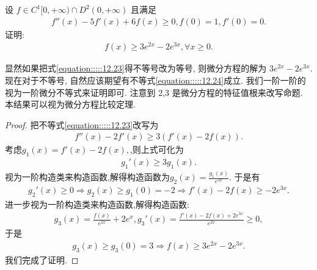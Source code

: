 \documentclass[../../main.tex]{subfiles}
\begin{document}
\begin{example}
设 $f\in C^1[0,+\infty)\cap D^2(0,+\infty)$ 且满足
\begin{align}
f''(x)-5f'(x)+6f(x)\geqslant0,f(0)=1,f'(0)=0.
\label{equation:::::12.23}
\end{align}
证明:
\begin{align}
f(x)\geqslant3e^{2x}-2e^{3x},\forall x\geqslant0.
\label{equation:::::12.24}
\end{align}
\end{example}
\begin{note}
显然如果把式\eqref{equation:::::12.23}得不等号改为等号, 则微分方程的解为 $3e^{2x}-2e^{3x}$. 现在对于不等号, 自然应该期望有不等式\eqref{equation:::::12.24}成立. 我们一阶一阶的视为一阶微分不等式来证明即可. 注意到 2,3 是微分方程的特征值根来改写命题. 本结果可以视为微分方程比较定理.
\end{note}
\begin{proof}
把不等式\eqref{equation:::::12.23}改写为
\begin{align*}
f''(x)-2f'(x)\geqslant3(f'(x)-2f(x)).
\end{align*}
考虑$g_1(x)=f'(x)-2f(x),$,则上式可化为
\begin{align*}
g_1'(x)\geqslant 3g_1(x).
\end{align*}
视为一阶构造类来构造函数,解得构造函数为$g_2(x)=\frac{g_1(x)}{e^{3x}}$.
于是有
\begin{align*}
g_2'(x)\geqslant0\Rightarrow g_2(x)\geqslant g_1(0)=-2\Rightarrow f'(x)-2f(x)\geqslant -2e^{3x}.
\end{align*}
进一步视为一阶构造类来构造函数,解得构造函数:
\begin{align*}
g_3(x)=\frac{f(x)}{e^{2x}}+2e^{x},g_3'(x)=\frac{f'(x)-2f(x)+2e^{3x}}{e^{2x}}\geqslant0,
\end{align*}
于是
\begin{align*}
g_3(x)\geqslant g_3(0)=3\Rightarrow f(x)\geqslant3e^{2x}-2e^{3x}.
\end{align*}
我们完成了证明. 
\end{proof}
\end{document}
